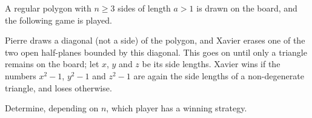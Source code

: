A regular polygon with $n \geq 3$ sides of length $a > 1$ is drawn on the board, and the following game is played.

Pierre draws a diagonal (not a side) of the polygon, and Xavier erases one of the two open half-planes bounded by this diagonal. This goes on until only a triangle remains on the board; let $x$, $y$ and $z$ be its side lengths. Xavier wins if the numbers $x^2 - 1$, $y^2 - 1$ and $z^2 - 1$ are again the side lengths of a non-degenerate triangle, and loses otherwise.

Determine, depending on $n$, which player has a winning strategy.
